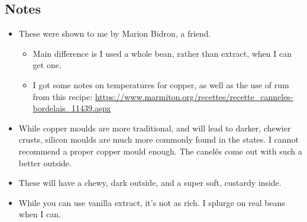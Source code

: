 \begin{multicols}{2}
\subsection*{Notes}
\begin{itemize}
    \item These were shown to me by Marion Bidron, a friend.
    \begin{itemize}
        \item Main difference is I used a whole bean, rather than extract, when I can get one.
        \item I got some notes on temperatures for copper, as well as the use of rum from this recipe: \url{https://www.marmiton.org/recettes/recette_canneles-bordelais_11439.aspx}
    \end{itemize}
    \item While copper moulds are more traditional, and will lead to darker, chewier crusts, silicon moulds are much more commonly found in the states. I cannot recommend a proper copper mould enough. The canelés come out with such a better outside.
    \item These will have a chewy, dark outside, and a super soft, custardy inside.
    \item While you can use vanilla extract, it's not as rich. I splurge on real beans when I can.
\end{itemize}
\end{multicols}
\clearpage